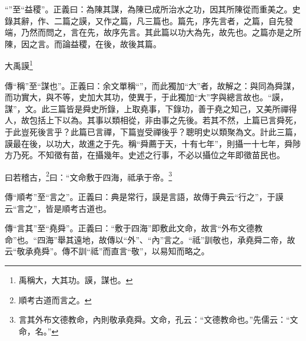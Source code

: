 {\noindent\shu{}\fzkt “”至“益稷”。正義曰：為陳其謀，為陳已成所治水之功，因其所陳從而重美之。史錄其辭，作、二篇之謨，又作之篇，凡三篇也。篇先，序先言者，之篇，自先發端，乃然而問之，言在先，故序先言。其此篇以功大為先，故先也。之篇亦是之所陳，因之言。而論益稷，在後，故後其篇。 \par}

大禹謨\footnote{禹稱大，大其功。謨，謀也。}

{\noindent\zhuan{}\fzbyks 傳“稱”至“謀也”。正義曰：余文單稱“”，而此獨加“大”者，故解之：與同為舜謀，而功實大，與不等，史加大其功，使異于，于此獨加“大”字與總言故也。“謨，謀”，文。此三篇皆是舜史所錄，上取堯事，下錄功，善于堯之知己，又美所禪得人，故包括上下以為。其事以類相從，非由事之先後。若其不然，上篇已言舜死，于此豈死後言乎？此篇已言禪，下篇豈受禪後乎？聰明史以類聚為文。計此三篇，謨最在後，以功大，故進之于先。稱“舜薦于天，十有七年”，則攝一十七年，舜陟方乃死。不知徵有苗，在攝幾年。史述之行事，不必以攝位之年即徵苗民也。 \par}

曰若稽古，\footnote{順考古道而言之。}曰：“文命敷于四海，祗承于帝。\footnote{言其外布文德教命，內則敬承堯舜。文命，孔云：“文德教命也。”先儒云：“文命，名。”}

{\noindent\zhuan{}\fzbyks 傳“順考”至“言之”。正義曰：典是常行，謨是言語，故傳于典云“行之”，于謨云“言之”，皆是順考古道也。 \par}

{\noindent\zhuan{}\fzbyks 傳“言其”至“堯舜”。正義曰：“敷于四海”即敷此文命，故言“外布文德教命”也。“四海”舉其遠地，故傳以“外”、“內”言之。“祗”訓敬也，承堯舜二帝，故云“敬承堯舜”。傳不訓“祗”而直言“敬”，以易知而略之。 \par}

